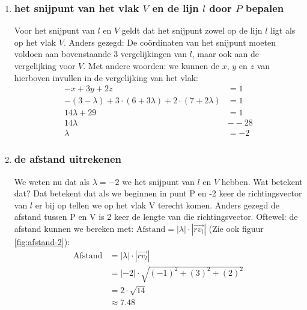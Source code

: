 \begin{enumerate}[label=(\alph*)]
\item \subsubsection{het snijpunt van het vlak $V$ en de lijn $l$ door $P$ bepalen}
Voor het snijpunt van $l$ en $V$ geldt dat het snijpunt zowel op de lijn $l$ ligt als op het vlak $V$. Anders gezegd: De coördinaten  van het snijpunt moeten voldoen aan bovenstaande $3$ vergelijkingen van $l$, maar ook aan de vergelijking voor $V$. Met andere woorden: we kunnen de $x$, $y$ en $z$ van hierboven invullen in de vergelijking van het vlak:
\begin{align*}
  -x + 3y +2z &= 1 \\
  -(3 -\lambda) + 3\cdot(6 + 3\lambda) + 2\cdot(7 + 2\lambda) &= 1 \\
  14\lambda + 29 &= 1 \\
  14\lambda &- -28 \\
  \lambda &= -2
\end{align*}

\item \subsubsection{de afstand uitrekenen}
We weten nu dat als $  \lambda = -2 $ we het snijpunt van $ l  $ en $ V $ hebben. Wat betekent dat? Dat betekent dat als we beginnen in punt P en -2 keer de richtingsvector van $  l $ er bij op tellen we op het vlak V terecht komen.
Anders gezegd de afstand tussen P en V is 2 keer de lengte van die richtingsvector. Oftewel: 
    de afstand kunnen we bereken met: $\text{Afstand} = |\lambda| \cdot |\overrightarrow{rv_{l}}|$ (Zie ook figuur \ref{fig:afstand-2}):
\begin{align*}
  \text{Afstand} &= |\lambda| \cdot |\overrightarrow{rv_{l}}| \\
                 &= |-2| \cdot \sqrt{(-1)^{2} + (3)^{2} + (2)^{2} } \\
                 &= 2 \cdot \sqrt{14} \\
                 &\approx 7.48
\end{align*}

\end{enumerate}	


